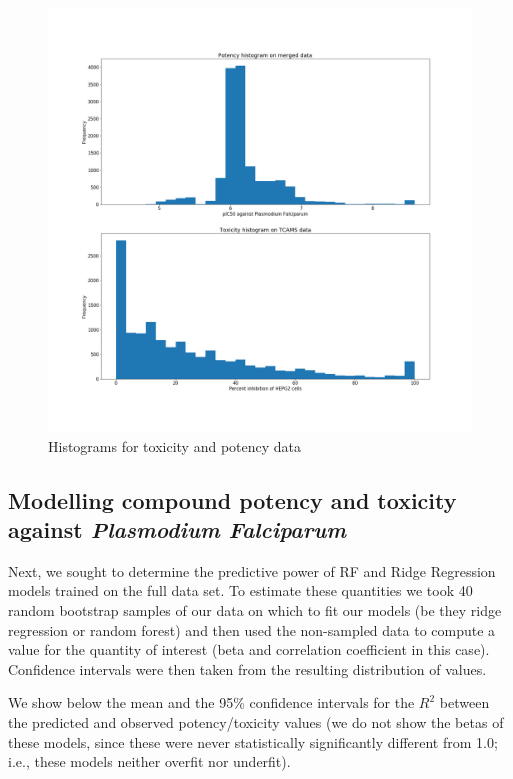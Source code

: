 \documentclass[journal=jacsat,manuscript=article]{achemso}
\begin{document}
\begin{figure}[h!]
\centering
\includegraphics[width=\textwidth]{fig1_hists.png}
\caption{Histograms for toxicity and potency data}
\label{fig:hist}
\end{figure}

\subsection*{Modelling compound potency and toxicity against {\it Plasmodium Falciparum}
}

Next, we sought to determine the predictive power of RF and Ridge Regression models trained on the full data set.  To estimate these quantities we took 40 random bootstrap samples of our data on which to fit our models (be they ridge regression or random forest) and then used the non-sampled data to compute a value for the quantity of interest (beta and correlation coefficient in this case). Confidence intervals were then taken from the resulting distribution of values.

We show below the mean and the 95\% confidence intervals for the $R^2$ between the predicted and observed potency/toxicity values (we do not show the betas of these models, since these were never statistically significantly different from 1.0; i.e., these models neither overfit nor underfit).
\end{document}

